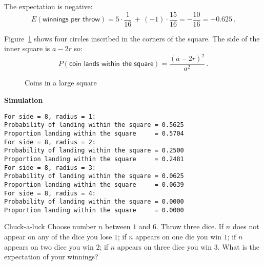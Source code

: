  The expectation is negative:
\[
E(\textsf{winnings per throw})=5\cdot\frac{1}{16}\,+\,(-1)\cdot\frac{15}{16}=-\frac{10}{16}=-0.625\,.
\]

 Figure~\ref{f.coins2} shows four circles inscribed in the corners of the square. The side of the inner square is $a-2r$ so:
\[
P(\textsf{coin lands within the square})=\frac{(a-2r)^2}{a^2}\,.
\]
\begin{figure}[tb]
\begin{center}
\end{center}
\caption{Coins in a large square}\label{f.coins2}
\end{figure}

\textbf{Simulation}
\begin{verbatim}
For side = 8, radius = 1:
Probability of landing within the square = 0.5625
Proportion landing within the square     = 0.5704
For side = 8, radius = 2:
Probability of landing within the square = 0.2500
Proportion landing within the square     = 0.2481
For side = 8, radius = 3:
Probability of landing within the square = 0.0625
Proportion landing within the square     = 0.0639
For side = 8, radius = 4:
Probability of landing within the square = 0.0000
Proportion landing within the square     = 0.0000
\end{verbatim}


\begin{prob}{Chuck-a-luck}
Choose number $n$ between $1$ and $6$. Throw three dice. If $n$ does not appear on any of the dice you lose $1$; if $n$ appears on one die you win $1$; if $n$ appears on two dice you win $2$; if $n$ appears on three dice you win $3$. What is the expectation of your winnings?
\end{prob}

